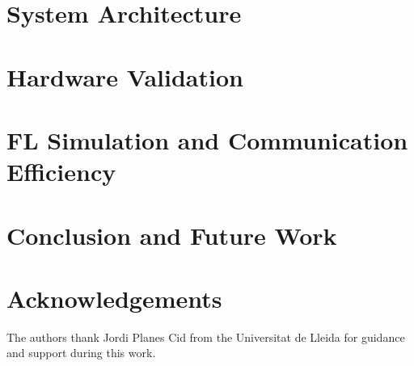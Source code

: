 \documentclass{IOS-Book-Article}
\begin{document}
\section{System Architecture}
\label{sec:architecture}


\section{Hardware Validation}
\label{sec:hardware}


\section{FL Simulation and Communication Efficiency}
\label{sec:fl_simulation}


\section{Conclusion and Future Work}
\label{sec:conclusion}


\vspace*{-2mm}\section*{Acknowledgements}
The authors thank Jordi Planes Cid from the Universitat de Lleida for guidance and support during this work.

\vspace*{-4mm}


\end{document}
